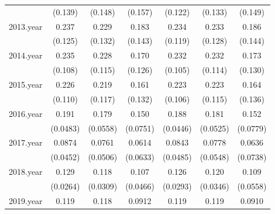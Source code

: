 {\begin{tabular}{l*{6}{c}}
            &     (0.139)         &     (0.148)         &     (0.157)         &     (0.122)         &     (0.133)         &     (0.149)         \\
[1em]
2013.year   &       0.237         &       0.229         &       0.183         &       0.234\sym{*}  &       0.233         &       0.186         \\
            &     (0.125)         &     (0.132)         &     (0.143)         &     (0.119)         &     (0.128)         &     (0.144)         \\
[1em]
2014.year   &       0.235\sym{*}  &       0.228         &       0.170         &       0.232\sym{*}  &       0.232\sym{*}  &       0.173         \\
            &     (0.108)         &     (0.115)         &     (0.126)         &     (0.105)         &     (0.114)         &     (0.130)         \\
[1em]
2015.year   &       0.226\sym{*}  &       0.219         &       0.161         &       0.223\sym{*}  &       0.223\sym{*}  &       0.164         \\
            &     (0.110)         &     (0.117)         &     (0.132)         &     (0.106)         &     (0.115)         &     (0.136)         \\
[1em]
2016.year   &       0.191\sym{**} &       0.179\sym{**} &       0.150         &       0.188\sym{***}&       0.181\sym{**} &       0.152\sym{*}  \\
            &    (0.0483)         &    (0.0558)         &    (0.0751)         &    (0.0446)         &    (0.0525)         &    (0.0779)         \\
[1em]
2017.year   &      0.0874         &      0.0761         &      0.0614         &      0.0843         &      0.0778         &      0.0636         \\
            &    (0.0452)         &    (0.0506)         &    (0.0633)         &    (0.0485)         &    (0.0548)         &    (0.0738)         \\
[1em]
2018.year   &       0.129\sym{***}&       0.118\sym{**} &       0.107\sym{*}  &       0.126\sym{***}&       0.120\sym{**} &       0.109\sym{*}  \\
            &    (0.0264)         &    (0.0309)         &    (0.0466)         &    (0.0293)         &    (0.0346)         &    (0.0558)         \\
[1em]
2019.year   &       0.119\sym{***}&       0.118\sym{***}&      0.0912\sym{***}&       0.119\sym{***}&       0.119\sym{***}&      0.0910\sym{**} \\

\end{tabular}}
